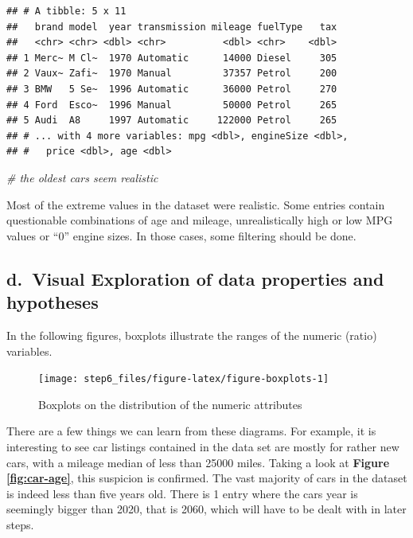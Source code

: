 \documentclass[sigchi]{acmart}
\newenvironment{Shaded}{\begin{snugshade}}{\end{snugshade}}
\newcommand{\CommentTok}[1]{\textcolor[rgb]{0.56,0.35,0.01}{\textit{#1}}}
\begin{document}
\begin{verbatim}
## # A tibble: 5 x 11
##   brand model  year transmission mileage fuelType   tax
##   <chr> <chr> <dbl> <chr>          <dbl> <chr>    <dbl>
## 1 Merc~ M Cl~  1970 Automatic      14000 Diesel     305
## 2 Vaux~ Zafi~  1970 Manual         37357 Petrol     200
## 3 BMW   5 Se~  1996 Automatic      36000 Petrol     270
## 4 Ford  Esco~  1996 Manual         50000 Petrol     265
## 5 Audi  A8     1997 Automatic     122000 Petrol     265
## # ... with 4 more variables: mpg <dbl>, engineSize <dbl>,
## #   price <dbl>, age <dbl>
\end{verbatim}

\begin{Shaded}
\begin{Highlighting}[]
\CommentTok{# the oldest cars seem realistic}
\end{Highlighting}
\end{Shaded}

Most of the extreme values in the dataset were realistic. Some entries contain questionable combinations of age and mileage, unrealistically high or low MPG values or ``0'' engine sizes. In those cases, some filtering should be done.

\hypertarget{d.-visual-exploration-of-data-properties-and-hypotheses}{%
\subsection{d.~Visual Exploration of data properties and hypotheses}\label{d.-visual-exploration-of-data-properties-and-hypotheses}}

In the following figures, boxplots illustrate the ranges of the numeric (ratio) variables.

\begin{figure}
\texttt{[image: step6\_files/figure-latex/figure-boxplots-1]} \caption{Boxplots on the distribution of the numeric attributes}\label{fig:figure-boxplots}
\end{figure}

There are a few things we can learn from these diagrams. For example, it is interesting to see car listings contained in the data set are mostly for rather new cars, with a mileage median of less than 25000 miles. Taking a look at \textbf{Figure \ref{fig:car-age}}, this suspicion is confirmed. The vast majority of cars in the dataset is indeed less than five years old. There is 1 entry where the cars year is seemingly bigger than 2020, that is 2060, which will have to be dealt with in later steps.
\end{document}
